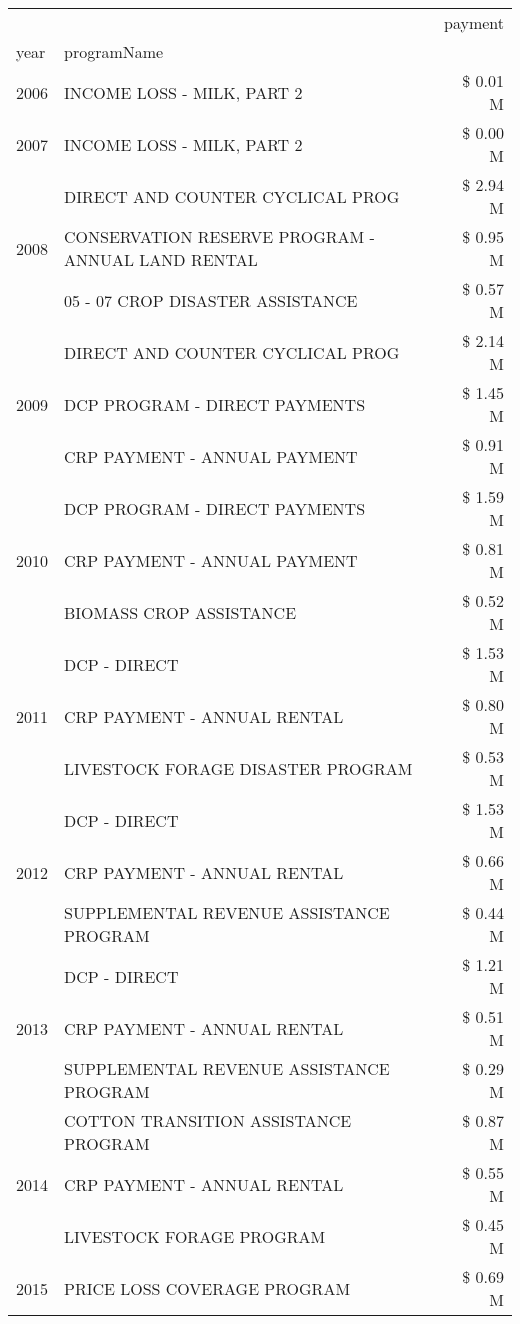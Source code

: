 \begin{tabular}{llr}
\toprule
 &  & payment \\
year & programName &  \\
\midrule
2006 & INCOME LOSS - MILK, PART 2 & \$ 0.01 M \\
\cline{1-3}
2007 & INCOME LOSS - MILK, PART 2 & \$ 0.00 M \\
\cline{1-3}
\multirow[t]{3}{*}{2008} & DIRECT AND COUNTER CYCLICAL PROG & \$ 2.94 M \\
 & CONSERVATION RESERVE PROGRAM - ANNUAL LAND RENTAL & \$ 0.95 M \\
 & 05 - 07 CROP DISASTER ASSISTANCE & \$ 0.57 M \\
\cline{1-3}
\multirow[t]{3}{*}{2009} & DIRECT AND COUNTER CYCLICAL PROG & \$ 2.14 M \\
 & DCP PROGRAM - DIRECT PAYMENTS & \$ 1.45 M \\
 & CRP PAYMENT - ANNUAL PAYMENT & \$ 0.91 M \\
\cline{1-3}
\multirow[t]{3}{*}{2010} & DCP PROGRAM - DIRECT PAYMENTS & \$ 1.59 M \\
 & CRP PAYMENT - ANNUAL PAYMENT & \$ 0.81 M \\
 & BIOMASS CROP ASSISTANCE & \$ 0.52 M \\
\cline{1-3}
\multirow[t]{3}{*}{2011} & DCP - DIRECT & \$ 1.53 M \\
 & CRP PAYMENT - ANNUAL RENTAL & \$ 0.80 M \\
 & LIVESTOCK FORAGE DISASTER PROGRAM & \$ 0.53 M \\
\cline{1-3}
\multirow[t]{3}{*}{2012} & DCP - DIRECT & \$ 1.53 M \\
 & CRP PAYMENT - ANNUAL RENTAL & \$ 0.66 M \\
 & SUPPLEMENTAL REVENUE ASSISTANCE PROGRAM & \$ 0.44 M \\
\cline{1-3}
\multirow[t]{3}{*}{2013} & DCP - DIRECT & \$ 1.21 M \\
 & CRP PAYMENT - ANNUAL RENTAL & \$ 0.51 M \\
 & SUPPLEMENTAL REVENUE ASSISTANCE PROGRAM & \$ 0.29 M \\
\cline{1-3}
\multirow[t]{3}{*}{2014} & COTTON TRANSITION ASSISTANCE PROGRAM & \$ 0.87 M \\
 & CRP PAYMENT - ANNUAL RENTAL & \$ 0.55 M \\
 & LIVESTOCK FORAGE PROGRAM & \$ 0.45 M \\
\cline{1-3}
\multirow[t]{3}{*}{2015} & PRICE LOSS COVERAGE PROGRAM & \$ 0.69 M \\

\end{tabular}
